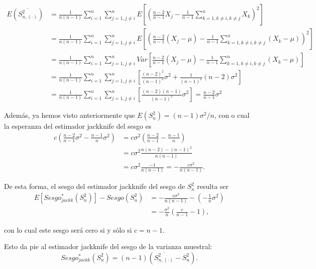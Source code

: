 \documentclass[]{book}
\theoremstyle{definition}
\theoremstyle{definition}
\theoremstyle{definition}
\theoremstyle{remark}
\begin{document}
\[\begin{aligned}
E\left( \overline{S_{n,(\cdot)}^2} \right) 
&=\frac{1}{n\left(
n-1 \right)}\sum_{i=1}^{n}\sum_{j=1,j\neq i}^{n}E\left[ \left( \frac{n-2}{n-1
}X_j-\frac{1}{n-1}\sum_{k=1,k\neq i,k\neq j}^{n}X_{k} \right)^2\right] \\
&=\frac{1}{n\left( n-1 \right)}\sum_{i=1}^{n}\sum_{j=1,j\neq i}^{n}E\left[
\left( \frac{n-2}{n-1}\left( X_j-\mu \right) -\frac{1}{n-1}\sum_{k=1,k\neq
i,k\neq j}^{n}\left( X_{k}-\mu \right) \right)^2\right] \\
&=\frac{1}{n\left( n-1 \right)}\sum_{i=1}^{n}\sum_{j=1,j\neq i}^{n}Var\left[ 
\frac{n-2}{n-1}\left( X_j-\mu \right) -\frac{1}{n-1}\sum_{k=1,k\neq
i,k\neq j}^{n}\left( X_{k}-\mu \right) \right] \\
&=\frac{1}{n\left( n-1 \right)}\sum_{i=1}^{n}\sum_{j=1,j\neq i}^{n}\left[ 
\frac{\left( n-2 \right)^2}{\left( n-1 \right)^2}\sigma^2+\frac{1}{
\left( n-1 \right)^2}\left( n-2 \right) \sigma^2\right] \\
&=\frac{1}{n\left( n-1 \right)}\sum_{i=1}^{n}\sum_{j=1,j\neq i}^{n}\left[ 
\frac{\left( n-2 \right) \left( n-1 \right)}{\left( n-1 \right)^2}\sigma
^2\right] =\frac{n-2}{n-1}\sigma^2
\end{aligned}\]

Además, ya hemos visto anteriormente que
\(E\left( S_n^2 \right) = (n-1)\sigma^2/n\), con o cual la esperanza del
estimador jackknife del sesgo es \[\begin{aligned}
c\left( \frac{n-2}{n-1}\sigma^2-\frac{n-1}{n}\sigma^2 \right)
&= c\sigma^2\left( \frac{n-2}{n-1}-\frac{n-1}{n} \right) \\
&= c\sigma^2\frac{n\left( n-2 \right) -\left( n-1 \right)^2}{n\left( n-1 \right)} \\
&= c\sigma^2\frac{-1}{n\left( n-1 \right)}
=-\frac{c\sigma^2}{n\left(n-1 \right)}.
\end{aligned}\]

De esta forma, el sesgo del estimador jackknife del sesgo de \(S_n^2\)
resulta ser \[\begin{aligned}
E\left[ Sesgo_{jackk}^{\ast}\left( S_n^2 \right) \right] 
-Sesgo\left(S_n^2 \right) &= -\frac{c\sigma^2}{n\left( n-1 \right)}
-\left( -\frac{1}{n}\sigma^2 \right) \\
&= -\frac{\sigma^2}{n}\left( \frac{c}{n-1}-1 \right),
\end{aligned}\]

con lo cual este sesgo será cero si y sólo si \(c=n-1\).

Esto da pie al estimador jackknife del sesgo de la varianza muestral:
\[Sesgo_{jackk}^{\ast}\left( S_n^2 \right) =\left( n-1 \right) \left( 
\overline{S_{n,(\cdot)}^2}-S_n^2 \right).\]
\end{document}
